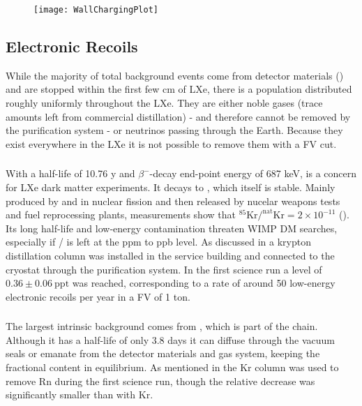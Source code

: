 \begin{figure}
\centering
\texttt{[image: WallChargingPlot]}
\label{fig:backgrounds_wall_charge}
\end{figure}


\subsection{Electronic Recoils}
\label{subsec:backgrounds_electronic}
While the majority of total background events come from detector materials () and are stopped
within the first few cm of LXe, there is a population distributed roughly uniformly throughout the LXe.  They are either noble gases (trace
amounts left from commercial distillation) - and therefore cannot be removed by the purification system - or neutrinos passing through the
Earth.  Because they exist everywhere in the LXe it is not possible to remove them with a FV cut.

\subsubsection{}
\label{subsubsec:backgrounds_electronic_krypton}
With a half-life of 10.76 y and $\beta^-$-decay end-point energy of 687 keV,  is a concern for LXe dark matter
experiments.  It decays to , which itself is stable.  Mainly
produced by  and  in nuclear fission and then released by nucelar weapons tests and fuel reprocessing plants,
measurements show that $\mathrm{^{85}Kr / ^{nat}Kr} = 2 \times 10^{-11}$ ().  Its long half-life and low-energy
contamination threaten WIMP DM searches, especially if / is left at the ppm to ppb level.  As discussed in
 a krypton distillation column was installed in the service building and connected to the cryostat through
the purification system.  In the first science run a level of $0.36 \pm 0.06\ \mathrm{ppt}$ was reached, corresponding to a rate of
around 50 low-energy electronic recoils per year in a FV of 1 ton.

\subsubsection{}
\label{subsubsec:backgrounds_electronic_radon}
The largest intrinsic background comes from , which is part of the  chain.  Although it has a half-life of only
3.8 days it can diffuse through the vacuum seals or emanate from the detector materials and gas system, keeping the fractional content in
equilibrium.  As mentioned in  the Kr column was used to remove Rn during the first science run, though the
relative decrease was significantly smaller than with Kr.

